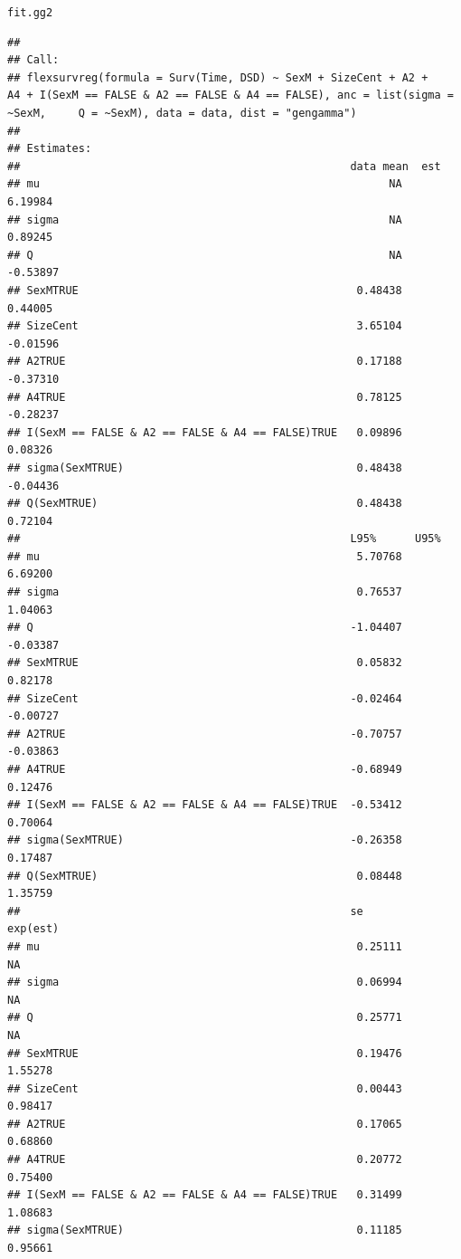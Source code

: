 \documentclass{article}\usepackage[]{graphicx}\usepackage[]{color}
\makeatletter
\newcommand{\hlstd}[1]{\textcolor[rgb]{0.345,0.345,0.345}{#1}}%
\newenvironment{kframe}{%
 \def\at@end@of@kframe{}%
 \ifinner\ifhmode%
  \def\at@end@of@kframe{\end{minipage}}%
  \begin{minipage}{\columnwidth}%
 \fi\fi%
 \def\FrameCommand##1{\hskip\@totalleftmargin \hskip-\fboxsep
 \colorbox{shadecolor}{##1}\hskip-\fboxsep
     \hskip-\linewidth \hskip-\@totalleftmargin \hskip\columnwidth}%
 \MakeFramed {\advance\hsize-\width
   \@totalleftmargin\z@ \linewidth\hsize
   \@setminipage}}%
 {\par\unskip\endMakeFramed%
 \at@end@of@kframe}
\newenvironment{knitrout}{}{} %
\makeatother
\begin{document}
\begin{knitrout}
\begin{kframe}
\begin{alltt}
\hlstd{fit.gg2}
\end{alltt}
\begin{verbatim}
## 
## Call:
## flexsurvreg(formula = Surv(Time, DSD) ~ SexM + SizeCent + A2 +     A4 + I(SexM == FALSE & A2 == FALSE & A4 == FALSE), anc = list(sigma = ~SexM,     Q = ~SexM), data = data, dist = "gengamma")
## 
## Estimates: 
##                                                   data mean  est     
## mu                                                      NA    6.19984
## sigma                                                   NA    0.89245
## Q                                                       NA   -0.53897
## SexMTRUE                                           0.48438    0.44005
## SizeCent                                           3.65104   -0.01596
## A2TRUE                                             0.17188   -0.37310
## A4TRUE                                             0.78125   -0.28237
## I(SexM == FALSE & A2 == FALSE & A4 == FALSE)TRUE   0.09896    0.08326
## sigma(SexMTRUE)                                    0.48438   -0.04436
## Q(SexMTRUE)                                        0.48438    0.72104
##                                                   L95%      U95%    
## mu                                                 5.70768   6.69200
## sigma                                              0.76537   1.04063
## Q                                                 -1.04407  -0.03387
## SexMTRUE                                           0.05832   0.82178
## SizeCent                                          -0.02464  -0.00727
## A2TRUE                                            -0.70757  -0.03863
## A4TRUE                                            -0.68949   0.12476
## I(SexM == FALSE & A2 == FALSE & A4 == FALSE)TRUE  -0.53412   0.70064
## sigma(SexMTRUE)                                   -0.26358   0.17487
## Q(SexMTRUE)                                        0.08448   1.35759
##                                                   se        exp(est)
## mu                                                 0.25111        NA
## sigma                                              0.06994        NA
## Q                                                  0.25771        NA
## SexMTRUE                                           0.19476   1.55278
## SizeCent                                           0.00443   0.98417
## A2TRUE                                             0.17065   0.68860
## A4TRUE                                             0.20772   0.75400
## I(SexM == FALSE & A2 == FALSE & A4 == FALSE)TRUE   0.31499   1.08683
## sigma(SexMTRUE)                                    0.11185   0.95661

\end{verbatim}
\end{kframe}
\end{knitrout}
\end{document}
